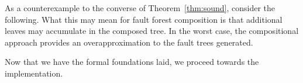 As a counterexample to the converse of Theorem~\ref{thm:sound}, consider the following.  What this may mean for fault forest composition is that additional leaves may accumulate in the composed tree. In the worst case, the compositional approach provides an overapproximation to the fault trees generated.

Now that we have the formal foundations laid, we proceed towards the implementation. 





